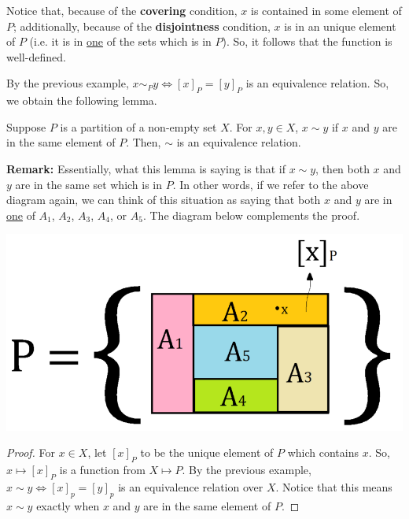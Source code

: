 \documentclass[letterpaper]{article}
\begin{document}
\bigskip 

Notice that, because of the \textbf{covering} condition, $x$ is contained in some element of $P$; additionally, because of the \textbf{disjointness} condition, $x$ is in an unique element of $P$ (i.e. it is in \underline{one} of the sets which is in $P$). So, it follows that the function is well-defined. 

\bigskip 

By the previous example, $x \sim_P y \iff [x]_P = [y]_P$ is an equivalence relation. So, we obtain the following lemma. 
\begin{lemma}{}{}
    Suppose $P$ is a partition of a non-empty set $X$. For $x, y \in X$, $x \sim y$ if $x$ and $y$ are in the same element of $P$. Then, $\sim$ is an equivalence relation.
\end{lemma}
\textbf{Remark:} Essentially, what this lemma is saying is that if $x \sim y$, then both $x$ and $y$ are in the same set which is in $P$. In other words, if we refer to the above diagram again, we can think of this situation as saying that both $x$ and $y$ are in \underline{one} of $A_1$, $A_2$, $A_3$, $A_4$, or $A_5$. The diagram below complements the proof.

\begin{center}
    \includegraphics[scale=0.30]{assets/partition_x.PNG}
\end{center}

\begin{mdframed}
    \begin{proof}
        For $x \in X$, let $[x]_P$ to be the unique element of $P$ which contains $x$. So, $x \mapsto [x]_P$ is a function from $X \mapsto P$. By the previous example, $x \sim y \iff [x]_p = [y]_p$ is an equivalence relation over $X$. Notice that this means $x \sim y$ exactly when $x$ and $y$ are in the same element of $P$. 
    \end{proof}
\end{mdframed}
\end{document}
